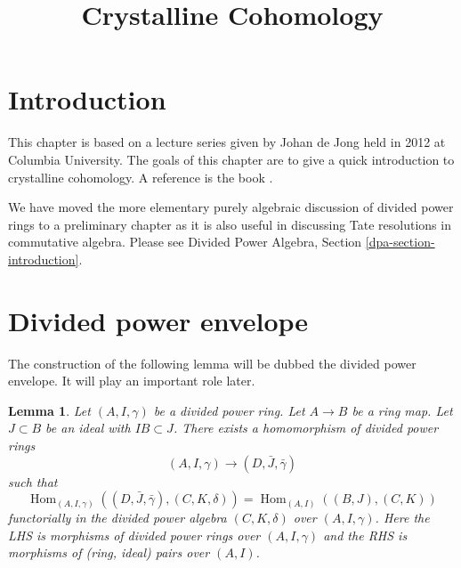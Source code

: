 \documentclass{stacks-project}
\theoremstyle{plain}
\newtheorem{lemma}[subsection]{Lemma}
\theoremstyle{definition}
\theoremstyle{remark}
\numberwithin{equation}{subsection}
\def\Hom{\mathop{\mathrm{Hom}}\nolimits}
\begin{document}
\title{Crystalline Cohomology}


\maketitle

\label{section-phantom}

\tableofcontents



\section{Introduction}
\label{section-introduction}

\noindent
This chapter is based on a lecture series given by Johan de Jong
held in 2012 at Columbia University.
The goals of this chapter are to give a quick introduction to
crystalline cohomology. A reference is the book \cite{Berthelot}.

\medskip\noindent
We have moved the more elementary purely algebraic discussion of divided
power rings to a preliminary chapter as it is also useful
in discussing Tate resolutions in commutative algebra.
Please see Divided Power Algebra, Section \ref{dpa-section-introduction}.













\section{Divided power envelope}
\label{section-divided-power-envelope}

\noindent
The construction of the following lemma will be dubbed the
divided power envelope. It will play an important role later.

\begin{lemma}
\label{lemma-divided-power-envelope}
Let $(A, I, \gamma)$ be a divided power ring.
Let $A \to B$ be a ring map. Let $J \subset B$ be an ideal
with $IB \subset J$. There exists a homomorphism of
divided power rings
$$
(A, I, \gamma) \longrightarrow (D, \bar J, \bar \gamma)
$$
such that
$$
\Hom_{(A, I, \gamma)}((D, \bar J, \bar \gamma), (C, K, \delta)) =
\Hom_{(A, I)}((B, J), (C, K))
$$
functorially in the divided power algebra $(C, K, \delta)$ over
$(A, I, \gamma)$. Here the LHS is morphisms of divided
power rings over $(A, I, \gamma)$ and the RHS is morphisms of
(ring, ideal) pairs over $(A, I)$.
\end{lemma}
\end{document}
